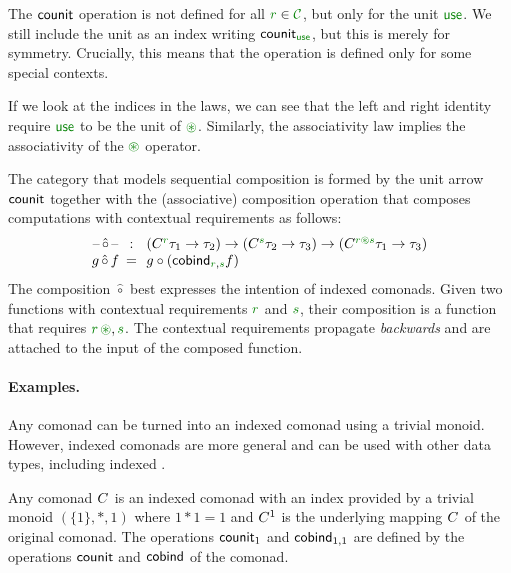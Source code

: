 The $\textnormal{\sffamily counit}$ operation is not defined for all $\cclrd{r} \in \C$, but only for 
the unit $\cunit$. We still include the unit as an index writing $\ident{counit}_{\cunit}$, 
but this is merely for symmetry. Crucially, this means that the operation is defined only
for some special contexts.

If we look at the indices in the laws, we can see that the left and right identity 
require $\cunit$ to be the unit of $\cseq$. Similarly, the associativity law implies the 
associativity of the $\cseq$ operator. 

The category that models sequential composition is formed by the unit arrow $\textnormal{\sffamily counit}$ 
together with the (associative) composition operation that composes computations with 
contextual requirements as follows:
%
\begin{equation*}
\begin{array}{ccl}
\textnormal{--}\, \hat{\circ} \,\textnormal{--}&\narrow{:}& (\ctyp{\cclrd{r}}{\tau_1} \rightarrow \tau_2) 
  \rightarrow (\ctyp{\cclrd{s}}{\tau_2} \rightarrow \tau_3) 
  \rightarrow (\ctyp{\cclrd{r} \cseq \cclrd{s}}{\tau_1} \rightarrow \tau_3) \\
g \, \hat{\circ} \, f &\narrow{=}& g \circ (\ident{cobind}_{\cclrd{r}, \cclrd{s}} f)
\end{array}
\end{equation*}
%
The composition $\hat{\circ}$ best expresses the intention of indexed comonads. Given two functions
with contextual requirements $\cclrd{r}$ and $\cclrd{s}$, their composition is a function that 
requires $\cclrd{r}\,\cseq,\cclrd{s}$. The contextual requirements propagate \emph{backwards} and
are attached to the input of the composed function.


\paragraph{Examples.}

Any comonad can be turned into an indexed comonad using a trivial monoid. However, indexed comonads
are more general and can be used with other data types, including indexed . 

\begin{example}[Comonads]
Any comonad $C^{}$ is an indexed comonad with an index provided by a trivial monoid $(\{1\},\ast,1)$
where $1\ast 1 = 1$ and $C^{1}$ is the underlying mapping $C^{}$ of the original comonad. The
operations $\textnormal{\sffamily counit}_1$ and $\textnormal{\sffamily cobind}_{1,1}$ are defined by the operations $\textnormal{\sffamily counit}$
and $\textnormal{\sffamily cobind}$ of the comonad.
\end{example}

